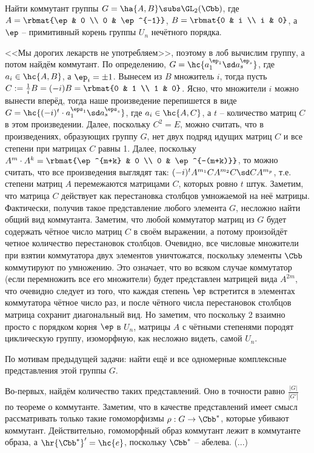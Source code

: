 \documentclass[a4paper]{article}
\begin{document}
\begin{problem}
Найти коммутант группы $G=\ha{A, B} \subs \GL_2(\Cbb)$, где
$A=\rbmat{\ep & 0 \\ 0 & \ep^{-1}}$, $B=\rbmat{0 & i \\ i & 0}$, а $\ep$ -- примитивный корень группы
$U_n$ нечётного порядка.
\end{problem}
\begin{solution}
<<Мы дорогих лекарств не употребляем>>, поэтому в лоб вычислим группу, а потом найдём коммутант.  По
определению, $G = \hc{a_1^{\ep_1}\sd a_s^{\ep_s}}$, где $a_i \in \hc{A, B}$, а $\ep_i = \pm 1$. Вынесем
из $B$ множитель $i$, тогда пусть $C := \frac{1}{i}B=(-i)B=\rbmat{0 & 1 \\ 1 & 0}$. Ясно, что множители $i$
можно вынести вперёд, тогда наше произведение перепишется в виде $G = \hc{(-i)^t \cdot
a_1^{\eps_1}\sd a_s^{\eps_s}}$, где $a_i \in \hc{A, C}$, а $t$ -- количество матриц $C$ в этом
произведении. Далее, поскольку $C^2=E$, можно считать, что в произведениях, образующих группу $G$, нет двух
подряд идущих матриц $C$ и все степени при матрицах $C$ равны 1. Далее, поскольку $A^m \cdot A^k=
\rbmat{\ep^{m+k} & 0 \\ 0 & \ep^{-(m+k)}}$, то можно считать, что все произведения выглядят так:
$(-i)^tA^{m_1}CA^{m_2}C\sd CA^{m_p}$, т.е. степени матриц $A$ перемежаются матрицами $C$, которых ровно
$t$ штук. Заметим, что матрица $C$ действует как перестановка столбцов умножаемой на неё матрицы. Фактически,
получив такое представление любого элемента $G$, несложно найти общий вид коммутанта. Заметим, что любой
коммутатор матриц из $G$ будет содержать чётное число матриц $C$ в своём выражении, а потому произойдёт
четное количество перестановок столбцов. Очевидно, все числовые множители при взятии коммутатора двух
элементов уничтожатся, поскольку элементы $\Cbb$ коммутируют по умножению. Это означает, что во всяком
случае коммутатор (если перемножить все его множители) будет представлен матрицей вида $A^{2m}$, что очевидно
следует из того, что каждая степень $\ep$ встретится в элементах коммутатора чётное число раз, и после
чётного числа перестановок столбцов матрица сохранит диагональный вид. Но заметим, что поскольку 2 взаимно
просто с порядком корня $\ep$ в $U_n$, матрицы $A$ с чётными степенями породят циклическую группу,
изоморфную, как несложно видеть, самой $U_n$.
\end{solution}

\begin{problem}
По мотивам предыдущей задачи: найти ещё и все одномерные комплексные представления этой группы $G$.
\end{problem}
\begin{solution}
Во-первых, найдём количество таких представлений. Оно в точности равно $\frac{|G|}{|G'|}$ по теореме  о
коммутанте. Заметим, что в качестве представлений имеет смысл рассматривать только такие гомоморфизмы $\rho:
G \to \Cbb^*$, которые убивают коммутант. Действительно, гомоморфный образ коммутант лежит в коммутанте образа,
а $\hr{\Cbb^*}'=\hc{e}$, поскольку $\Cbb^*$ -- абелева. (...)
\end{solution}
\end{document}
